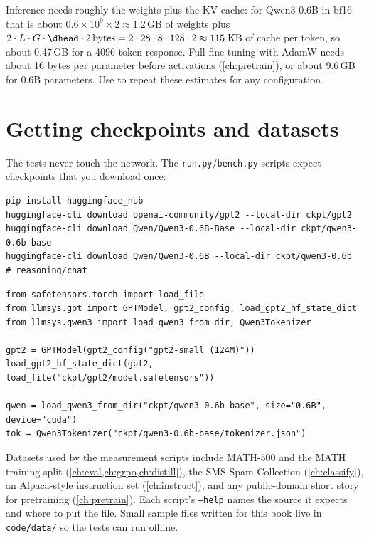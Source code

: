 \begin{napkinmath}
Inference needs roughly the weights plus the KV cache: for Qwen3-0.6B in bf16 that is
about $0.6\times10^9\times 2\approx 1.2$\,GB of weights plus
$2\cdot L\cdot G\cdot \dhead\cdot 2\,\text{bytes} = 2\cdot28\cdot8\cdot128\cdot2 \approx 115$\,KB
of cache per token, so about 0.47\,GB for a 4096-token response. Full fine-tuning with AdamW
needs about 16 bytes per parameter before activations (\cref{ch:pretrain}), or about 9.6\,GB for
0.6B parameters. Use  to repeat these estimates for any configuration.
\end{napkinmath}

\section{Getting checkpoints and datasets}

The tests never touch the network. The \texttt{run.py}/\texttt{bench.py} scripts expect
checkpoints that you download once:

\begin{lstlisting}[style=shell]
pip install huggingface_hub
huggingface-cli download openai-community/gpt2 --local-dir ckpt/gpt2
huggingface-cli download Qwen/Qwen3-0.6B-Base --local-dir ckpt/qwen3-0.6b-base
huggingface-cli download Qwen/Qwen3-0.6B --local-dir ckpt/qwen3-0.6b   # reasoning/chat
\end{lstlisting}

\begin{lstlisting}[caption={Loading the downloaded checkpoints into our from-scratch modules.},label={lst:setup:load}]
from safetensors.torch import load_file
from llmsys.gpt import GPTModel, gpt2_config, load_gpt2_hf_state_dict
from llmsys.qwen3 import load_qwen3_from_dir, Qwen3Tokenizer

gpt2 = GPTModel(gpt2_config("gpt2-small (124M)"))
load_gpt2_hf_state_dict(gpt2, load_file("ckpt/gpt2/model.safetensors"))

qwen = load_qwen3_from_dir("ckpt/qwen3-0.6b-base", size="0.6B", device="cuda")
tok = Qwen3Tokenizer("ckpt/qwen3-0.6b-base/tokenizer.json")
\end{lstlisting}

Datasets used by the measurement scripts include MATH-500 and the MATH training split
(\cref{ch:eval,ch:grpo,ch:distill}), the SMS Spam Collection (\cref{ch:classify}), an
Alpaca-style instruction set (\cref{ch:instruct}), and any public-domain short story for
pretraining (\cref{ch:pretrain}). Each script's \texttt{--help} names the source it expects
and where to put the file. Small sample files written for this book live in \texttt{code/data/}
so the tests can run offline.

